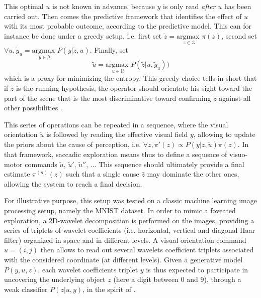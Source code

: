 \documentclass[12pt,twoside,openright]{article}
\begin{document}
	This optimal $u$ is not known in advance, because $y$ is only read \emph{after} $u$ has been carried out. Then comes the predictive framework that identifies the effect of $u$ with its most probable outcome, according to the predictive model. This can for instance be done under a greedy setup, i.e. first set $\tilde{z} = \underset{z \in \mathcal{Z}}{\text{argmax }} \pi(z)$, second set $\forall u, \tilde{y}_u = \underset{y \in \mathcal{Y}}{\text{argmax }} P(y|\tilde{z},u)$.
	Finally, set 
	\begin{equation}
	\tilde{u} = \underset{u \in \mathcal{U}}{\text{argmax }}  P(\tilde{z}|u,\tilde{y}_u))
	\end{equation} which is a proxy for minimizing the entropy. This greedy choice tells in short that if $\tilde{z}$ is the running hypothesis, the operator should orientate his sight toward 
	the part of the scene that is the most discriminative toward confirming $\tilde{z}$ against all other possibilities \cite{friston2012perceptions}. 
	
	This series of operations can be repeated in a sequence, where the visual orientation $\tilde{u}$ is followed by reading the effective visual field $y$, allowing to update the priors about the cause of perception, i.e. $\forall z, \pi'(z) \propto  P(y|z,\tilde{u}) \pi(z)$. In that framework, saccadic exploration means thus to define a sequence of visuo-motor commands $\tilde{u}$, $\tilde{u}'$, $\tilde{u}''$, ... This sequence should ultimately provide a final estimate $\pi^{(n)}(z)$ such that a single cause $\hat{z}$ may dominate the other ones, allowing the system to reach a final decision.   
	
	For illustrative purpose, this setup was tested on a classic machine learning image processing setup, namely the MNIST dataset. In order to mimic a foveated exploration, a 2D-wavelet decomposition is performed on the images, providing a series of triplets of wavelet coefficients (i.e. horizontal, vertical and diagonal Haar filter) organized in space and in different levels. A visual orientation command $u = (i,j)$ then allows to read out several wavelets coefficient triplets associated with the considered coordinate (at different levels). Given a generative model $P(y,u,z)$, each  wavelet coefficients triplet $y$ is thus expected to participate in uncovering the underlying object $z$ (here a digit between 0 and 9), through a weak classifier $P(z|u,y)$, in the spirit of \cite{viola2003fast}.
\end{document}
